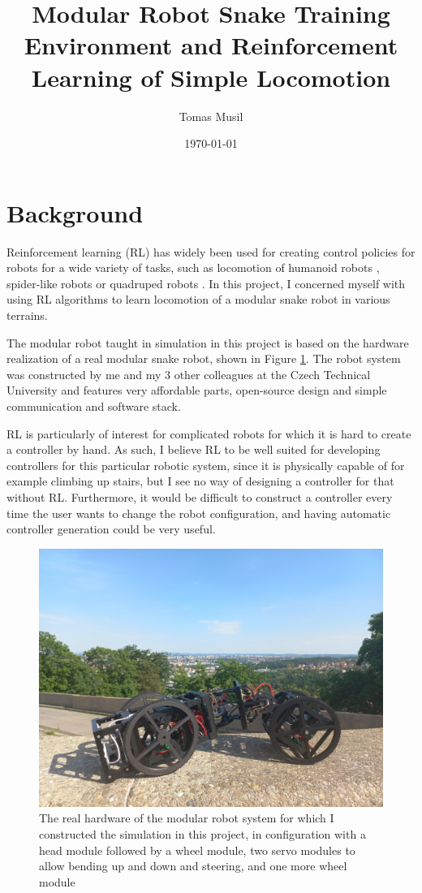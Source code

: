 \documentclass{article}
\author{Tomas Musil}
\date{\today}
\title{Modular Robot Snake Training Environment and Reinforcement Learning of Simple Locomotion}
\begin{document}
\maketitle

\section{Background}
Reinforcement learning (RL) has widely been used for creating control policies for robots for a wide variety of tasks, such as locomotion of humanoid robots \cite{ppo}, spider-like robots \cite{emergence} or quadruped robots \cite{massively}.
In this project, I concerned myself with using RL algorithms to learn locomotion of a modular snake robot in various terrains.

The modular robot taught in simulation in this project is based on the hardware realization of a real modular snake robot, shown in Figure \ref{fig:hw}.
The robot system was constructed by me and my 3 other colleagues at the Czech Technical University and features very affordable parts, open-source design and simple communication and software stack.

RL is particularly of interest for complicated robots for which it is hard to create a controller by hand. 
As such, I believe RL to be well suited for developing controllers for this particular robotic system, since it is physically capable of for example climbing up stairs, but I see no way of designing a controller for that without RL.
Furthermore, it would be difficult to construct a controller every time the user wants to change the robot configuration, and having automatic controller generation could be very useful.

\begin{figure}[!h]
 \centering 
  \includegraphics[width=.8\textwidth, trim={15cm 10cm 10cm 45cm}, clip]{fig/snek_real.jpg}
  \caption{The real hardware of the modular robot system for which I constructed the simulation in this project, in configuration with a head module followed by a wheel module, two servo modules to allow bending up and down and steering, and one more wheel module}
\label{fig:hw}
\end{figure}
\end{document}
